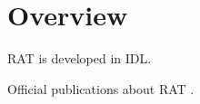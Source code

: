 \chapter{Overview}

RAT is developed in IDL\cite{web:idlvm}.

Official publications about RAT \cite{reigber04:rat, neumann05:rat, neumann07:rat}.

